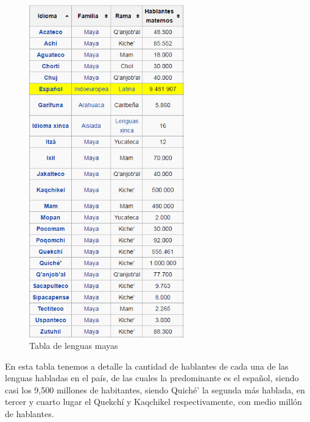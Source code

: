 \documentclass[a4paper,openright,11pt]{article}
\begin{document}
\begin{figure}[H]
	\centering
	\includegraphics[width=0.6\textwidth]{tablalenguas}
	\caption{Tabla de lenguas mayas}
	\label{fig:tabla}
\end{figure}
En esta tabla tenemos a detalle la cantidad de hablantes de cada una de las lenguas habladas en el país, de las cuales la predominante es el español, siendo casi los 9,500 millones de habitantes, siendo Quiché' la segunda más hablada, en tercer y cuarto lugar el Quekchí y Kaqchikel respectivamente, con medio millón de hablantes.
\end{document}
